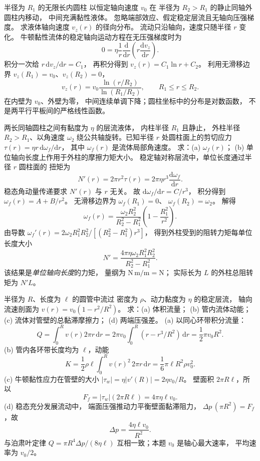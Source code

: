 半径为 $R_1$ 的无限长内圆柱
以恒定轴向速度 $v_0$ 在
半径为 $R_2>R_1$ 的静止同轴外圆柱内移动，
中间充满黏性液体。
忽略端部效应、假定稳定层流且无轴向压强梯度。
求液体轴向速度 $v_z(r)$ 的径向分布。
\exsolution
流动只沿轴向，速度只随半径 $r$ 变化。
牛顿黏性流体的稳定轴向运动方程在无压强梯度时为
\[
0=\eta\frac1r\frac{\mathrm d}{\mathrm dr}
\left(r\frac{\mathrm dv_z}{\mathrm dr}\right).
\]
积分一次给 $r\,\mathrm dv_z/\mathrm dr=C_1$，
再积分得到
$v_z(r)=C_1\ln r+C_2$。
利用无滑移边界
$v_z(R_1)=v_0$、$v_z(R_2)=0$，
\[
\boxed{v_z(r)=v_0
\frac{\ln(r/R_2)}{\ln(R_1/R_2)}},
\qquad R_1\le r\le R_2.
\]
\excheck 在内壁为 $v_0$、外壁为零，
中间连续单调下降；圆柱坐标中的分布是对数函数，
不是两平行平板间的严格线性函数。

两长同轴圆柱之间有黏度为 $\eta$ 的层流液体，
内柱半径 $R_1$ 且静止，
外柱半径 $R_2>R_1$、以角速度 $\omega_2$
绕公共轴旋转。已知半径 $r$ 处圆柱面上的剪切应力
$\tau(r)=\eta r\,\mathrm d\omega_f/\mathrm dr$，
其中 $\omega_f(r)$ 是流体局部角速度。
求：(a) $\omega_f(r)$；
(b) 单位轴向长度上作用于外柱的摩擦力矩大小。
\exsolution
稳定轴对称层流中，单位长度通过半径 $r$ 圆柱面的
扭矩为
\[
N'(r)=2\pi r^2\tau(r)
=2\pi\eta r^3\frac{\mathrm d\omega_f}{\mathrm dr}.
\]
稳态角动量传递要求 $N'(r)$ 与 $r$ 无关。
故 $\mathrm d\omega_f/\mathrm dr=C/r^3$，
积分得到
$\omega_f(r)=A+B/r^2$。
无滑移边界为
$\omega_f(R_1)=0$、
$\omega_f(R_2)=\omega_2$。
解得
\[
\boxed{\omega_f(r)=
\frac{\omega_2R_2^2}{R_2^2-R_1^2}
\left(1-\frac{R_1^2}{r^2}\right)}.
\]
由导数
$\omega_f'(r)=
2\omega_2R_1^2R_2^2/
[(R_2^2-R_1^2)r^3]$，
得到外柱受到的阻转力矩每单位长度大小
\[
\boxed{N'=
\frac{4\pi\eta\omega_2 R_1^2R_2^2}
{R_2^2-R_1^2}}.
\]
\excheck 该结果是\emph{单位轴向长度}的力矩，
量纲为 $\mathrm{N\,m/m}=\mathrm N$；
实际长为 $L$ 的外柱总阻转矩为 $N'L$。

半径为 $R$、长度为 $\ell$ 的圆管中流过
密度为 $\rho$、动力黏度为 $\eta$ 的稳定层流，
轴向流速剖面为
$v(r)=v_0(1-r^2/R^2)$。
求：(a) 体积流量；
(b) 管内流体动能；
(c) 流体对管壁的总黏滞摩擦力；
(d) 两端压强差。
\exsolution
(a) 以同心环带积分流量：
\[
Q=\int_0^R v(r)2\pi r\,\mathrm dr
=2\pi v_0\int_0^R(r-r^3/R^2)\,\mathrm dr
=\boxed{\frac12\pi v_0R^2}.
\]
(b) 管内各环带长度均为 $\ell$，动能
\[
K=\frac12\rho\ell\int_0^R v(r)^2\,2\pi r\,\mathrm dr
=\boxed{\frac16\pi\ell R^2\rho v_0^2}.
\]
(c) 牛顿黏性应力在管壁的大小
$|\tau_w|=\eta|v'(R)|=2\eta v_0/R$。
壁面积 $2\pi R\ell$，所以
\[
\boxed{F_f=|\tau_w|(2\pi R\ell)=4\pi\eta\ell v_0}.
\]
(d) 稳态充分发展流动中，
端面压强推动力平衡壁面黏滞阻力，
$\Delta p\,(\pi R^2)=F_f$，故
\[
\boxed{\Delta p=\frac{4\eta\ell v_0}{R^2}}.
\]
\excheck 与泊肃叶定律
$Q=\pi R^4\Delta p/(8\eta\ell)$
互相一致；本题 $v_0$ 是轴心最大速率，
平均速率为 $v_0/2$。

